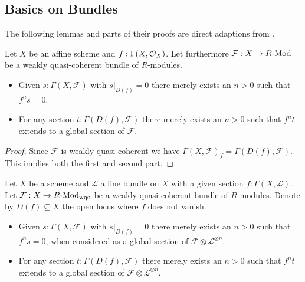 {}

\subsection{Basics on Bundles}

The following lemmas and parts of their proofs are direct adaptions from \cite[Chapter II.5]{Hartshorne}.

\begin{lemma}
  \label{affine-extension-of-sections}
  Let $X$ be an affine scheme and $f:\Gamma(X,\mathcal{O}_X)$.
  Let furthermore $\mathcal F : X \to R\text{-}\mathrm{Mod}$ be a weakly quasi-coherent bundle of $R$-modules.
  \begin{itemize}
    \item[i)] Given $s:\Gamma (X,\mathcal F)$ with $s|_{D(f)} = 0$  there merely exists an $n>0$ such that $f^ns=0$.
    \item[ii)] For any section $t:\Gamma (D(f),\mathcal F)$ there merely exists an $n>0$
      such that $f^nt$ extends to a global section of $\mathcal F$.
  \end{itemize}
\end{lemma}

\begin{proof}
  Since $\mathcal F$ is weakly quasi-coherent we have $\Gamma (X,\mathcal F)_f = \Gamma (D(f),\mathcal F)$.
  This implies both the first and second part.
\end{proof}


\begin{lemma}
  \label{extension-of-sections-by-twisting}
  Let $X$ be a scheme and $\mathcal L$ a line bundle on $X$ with a given section $f:\Gamma (X,\mathcal L)$.
  Let $\mathcal F:X\to R\text{-}\mathrm{Mod}_{\mathrm{wqc}}$ be a weakly quasi-coherent bundle of $R$-modules.
  Denote by $D(f) \subseteq X$ the open locus where $f$ does not vanish.
  \begin{itemize}
    \item[i)] Given $s:\Gamma (X,\mathcal F)$ with $s|_{D(f)} = 0$ there merely exists an $n>0$ such that $f^ns=0$,
      when considered as a global section of $\mathcal F \otimes \mathcal L^{\otimes n}$.
    \item[ii)] For any section $t:\Gamma (D(f),\mathcal F)$ there merely exists an $n>0$
      such that $f^nt$ extends to a global section of $\mathcal F \otimes \mathcal L^{\otimes n}$.
  \end{itemize}
\end{lemma}

